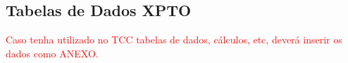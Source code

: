 \documentclass[]{senac-tcc}
\begin{document}

\begin{anexosenv}


\chapter{Tabelas de Dados XPTO}

\textcolor{red}{Caso tenha utilizado no TCC tabelas de dados, cálculos, etc, deverá inserir os dados como ANEXO.}

\lipsum[30]

\end{anexosenv}

\printindex
\end{document}
